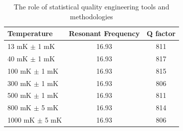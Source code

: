 \documentclass{utmthesis}
\begin{document}
\begin{landscape}
\begin{table}[p]
\centering
\caption{The role of statistical quality engineering tools and methodologies}
\vspace{\baselineskip}
\begin{tabular}{l c c}
  \hline
  \hline
  Temperature & Resonant Frequency & Q factor\\
  \hline
  13 mK $\pm$ 1 mK & 16.93 & 811 \\
  40 mK $\pm$ 1 mK & 16.93 & 817 \\
  100 mK $\pm$ 1 mK & 16.93 & 815 \\
  300 mK $\pm$ 1 mK & 16.93 & 806\\
  500 mK $\pm$ 1 mK & 16.93 & 811\\
  800 mK $\pm$ 5 mK & 16.93 & 814\\
  1000 mK $\pm$ 5 mK & 16.93 & 806 \\
  \hline
  \hline
\end{tabular}
\end{table}
\end{landscape}
\end{document}
